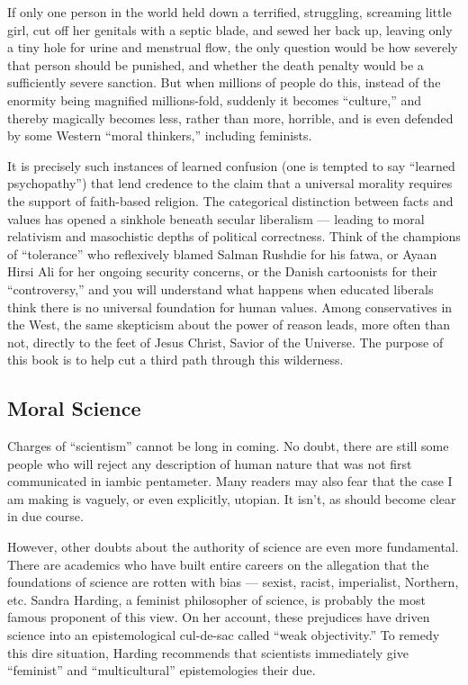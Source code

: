 \documentclass[a4paper,14pt]{extbook}
\begin{document}
If only one person in the world held down a terrified, struggling, screaming little girl, cut off her genitals with a septic blade, and sewed her back up, leaving only a tiny hole for urine and menstrual flow, the only question would be how severely that person should be punished, and whether the death penalty would be a sufficiently severe sanction.
But when millions of people do this, instead of the enormity being magnified millions-fold, suddenly it becomes ``culture,'' and thereby magically becomes less, rather than more, horrible, and is even defended by some Western ``moral thinkers,'' including feminists.

It is precisely such instances of learned confusion (one is tempted to say ``learned psychopathy'') that lend credence to the claim that a universal morality requires the support of faith-based religion.
The categorical distinction between facts and values has opened a sinkhole beneath secular liberalism --- leading to moral relativism and masochistic depths of political correctness.
Think of the champions of ``tolerance'' who reflexively blamed Salman Rushdie for his fatwa, or Ayaan Hirsi Ali for her ongoing security concerns, or the Danish cartoonists for their ``controversy,'' and you will understand what happens when educated liberals think there is no universal foundation for human values.
Among conservatives in the West, the same skepticism about the power of reason leads, more often than not, directly to the feet of Jesus Christ, Savior of the Universe.
The purpose of this book is to help cut a third path through this wilderness.

\subsection{Moral Science}

Charges of ``scientism'' cannot be long in coming.
No doubt, there are still some people who will reject any description of human nature that was not first communicated in iambic pentameter.
Many readers may also fear that the case I am making is vaguely, or even explicitly, utopian.
It isn't, as should become clear in due course.

However, other doubts about the authority of science are even more fundamental.
There are academics who have built entire careers on the allegation that the foundations of science are rotten with bias --- sexist, racist, imperialist, Northern, etc.
Sandra Harding, a feminist philosopher of science, is probably the most famous proponent of this view.
On her account, these prejudices have driven science into an epistemological cul-de-sac called ``weak objectivity.''
To remedy this dire situation, Harding recommends that scientists immediately give ``feminist'' and ``multicultural'' epistemologies their due.
\end{document}
